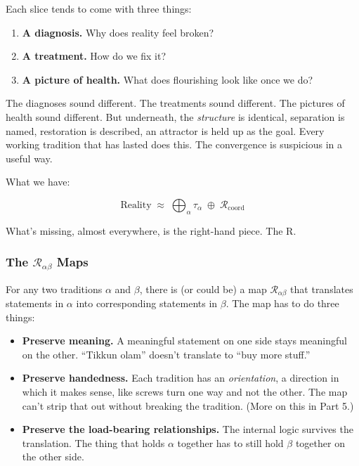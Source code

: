 \documentclass[
]{article}
\providecommand{\tightlist}{%
  \setlength{\itemsep}{0pt}\setlength{\parskip}{0pt}}
\begin{document}
Each slice tends to come with three things:

\begin{enumerate}
\def\labelenumi{\arabic{enumi}.}
\tightlist
\item
  \textbf{A diagnosis.} Why does reality feel broken?
\item
  \textbf{A treatment.} How do we fix it?
\item
  \textbf{A picture of health.} What does flourishing look like once we
  do?
\end{enumerate}

The diagnoses sound different. The treatments sound different. The
pictures of health sound different. But underneath, the \emph{structure}
is identical, separation is named, restoration is described, an
attractor is held up as the goal. Every working tradition that has
lasted does this. The convergence is suspicious in a useful way.

What we have:

\[\mathrm{Reality} \;\approx\; \bigoplus_\alpha \tau_\alpha \;\oplus\; \mathcal{R}_{\mathrm{coord}}\]

What's missing, almost everywhere, is the right-hand piece. The R.

\subsubsection{\texorpdfstring{The \(\mathcal{R}_{\alpha\beta}\)
Maps}{The \textbackslash mathcal\{R\}\_\{\textbackslash alpha\textbackslash beta\} Maps}}\label{the-mathcalr_alphabeta-maps}

For any two traditions \(\alpha\) and \(\beta\), there is (or could be) a map
\(\mathcal{R}_{\alpha\beta}\) that translates statements in \(\alpha\) into
corresponding statements in \(\beta\). The map has to do three things:

\begin{itemize}
\tightlist
\item
  \textbf{Preserve meaning.} A meaningful statement on one side stays
  meaningful on the other. ``Tikkun olam'' doesn't translate to ``buy
  more stuff.''
\item
  \textbf{Preserve handedness.} Each tradition has an
  \emph{orientation}, a direction in which it makes sense, like screws
  turn one way and not the other. The map can't strip that out without
  breaking the tradition. (More on this in Part 5.)
\item
  \textbf{Preserve the load-bearing relationships.} The internal logic
  survives the translation. The thing that holds \(\alpha\) together has to still
  hold \(\beta\) together on the other side.
\end{itemize}
\end{document}
